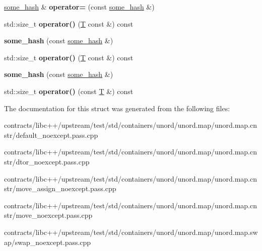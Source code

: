 \begin{DoxyCompactItemize}
\mbox{\hyperlink{structsome__hash}{some\+\_\+hash}} \& {\bfseries operator=} (const \mbox{\hyperlink{structsome__hash}{some\+\_\+hash}} \&)
\item 
\mbox{\label{structsome__hash_a2796c87fba10362bbbcf115a7166ecc0}} 
std\+::size\+\_\+t {\bfseries operator()} (\mbox{\hyperlink{struct_t}{T}} const \&) const
\item 
\mbox{\label{structsome__hash_a723612fc40aa55a03af0ba2a04ba66c2}} 
{\bfseries some\+\_\+hash} (const \mbox{\hyperlink{structsome__hash}{some\+\_\+hash}} \&)
\item 
\mbox{\label{structsome__hash_a2796c87fba10362bbbcf115a7166ecc0}} 
std\+::size\+\_\+t {\bfseries operator()} (\mbox{\hyperlink{struct_t}{T}} const \&) const
\item 
\mbox{\label{structsome__hash_a723612fc40aa55a03af0ba2a04ba66c2}} 
{\bfseries some\+\_\+hash} (const \mbox{\hyperlink{structsome__hash}{some\+\_\+hash}} \&)
\item 
\mbox{\label{structsome__hash_a244bd52cea7523ea234352452f5903b3}} 
std\+::size\+\_\+t {\bfseries operator()} (const \mbox{\hyperlink{struct_t}{T}} \&) const
\end{DoxyCompactItemize}


The documentation for this struct was generated from the following files\+:\begin{DoxyCompactItemize}
\item 
contracts/libc++/upstream/test/std/containers/unord/unord.\+map/unord.\+map.\+cnstr/default\+\_\+noexcept.\+pass.\+cpp\item 
contracts/libc++/upstream/test/std/containers/unord/unord.\+map/unord.\+map.\+cnstr/dtor\+\_\+noexcept.\+pass.\+cpp\item 
contracts/libc++/upstream/test/std/containers/unord/unord.\+map/unord.\+map.\+cnstr/move\+\_\+assign\+\_\+noexcept.\+pass.\+cpp\item 
contracts/libc++/upstream/test/std/containers/unord/unord.\+map/unord.\+map.\+cnstr/move\+\_\+noexcept.\+pass.\+cpp\item 
contracts/libc++/upstream/test/std/containers/unord/unord.\+map/unord.\+map.\+swap/swap\+\_\+noexcept.\+pass.\+cpp\end{DoxyCompactItemize}
